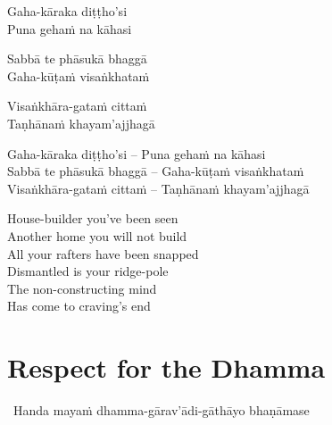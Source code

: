 \ifninebythirteen

\begin{pali-hang-verses}
  Gaha-kāraka diṭṭho'si\\
  Puna gehaṁ na kāhasi
\end{pali-hang-verses}
\begin{pali-hang-together}
  Sabbā te phāsukā bhaggā\\
  Gaha-kūṭaṁ visaṅkhataṁ\\
\end{pali-hang-together}
\begin{pali-hang-together}
  Visaṅkhāra-gataṁ cittaṁ\\
  Taṇhānaṁ khayam'ajjhagā
\end{pali-hang-together}

\clearpage

\else

\begin{verses}
  Gaha-kāraka diṭṭho'si – Puna gehaṁ na kāhasi\\
  Sabbā te phāsukā bhaggā – Gaha-kūṭaṁ visaṅkhataṁ\\
  Visaṅkhāra-gataṁ cittaṁ – Taṇhānaṁ khayam'ajjhagā
\end{verses}

\fi

\begin{english-verses}
  House-builder you've been seen\\
  Another home you will not build\\
  All your rafters have been snapped\\
  Dismantled is your ridge-pole\\
  The non-constructing mind\\
  Has come to craving's end
\end{english-verses}

\suttaRef{[Dhp 153-154]}

\ifdigital{}\fi



\section{Respect for the Dhamma}
\label{respect-for-the-dhamma}

\begin{leader}
  \anglebracketleft\ \hspace{-0.5mm}Handa mayaṁ dhamma-gārav'ādi-gāthāyo bhaṇāmase \hspace{-0.5mm}\anglebracketright\
\end{leader}

